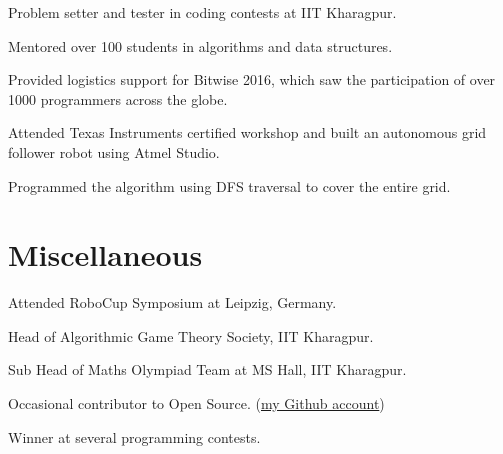 \documentclass[a4paper]{deedy-resume} %
\begin{document}
\begin{minipage}[t]{0.66\textwidth}
  \sectionspace

  \runsubsection{}
  \begin{tightitemize}
  \item Problem setter and tester in coding contests at IIT Kharagpur.
  \item Mentored over 100 students in algorithms and data structures.
  \item Provided logistics support for Bitwise 2016, which saw the participation of over 1000 programmers across the globe.
  \end{tightitemize}
  
  \sectionspace

  \runsubsection{}
  \begin{tightitemize}
  \item Attended Texas Instruments certified workshop and built an autonomous grid follower robot using Atmel Studio.
  \item Programmed the algorithm using DFS traversal to cover the entire grid.
  \end{tightitemize}

  \section{Miscellaneous}
  \vspace{\topsep}
  \begin{tightitemize}
  \item Attended RoboCup Symposium at Leipzig, Germany.
  \item Head of Algorithmic Game Theory Society, IIT Kharagpur.
  \item Sub Head of Maths Olympiad Team at MS Hall, IIT Kharagpur.
  \item Occasional contributor to Open Source.
    (\href{https://github.com/VaibhavAgarwalVA}{my Github account})
  \item Winner at several programming contests.
  \end{tightitemize}

\end{minipage}
\end{document}
